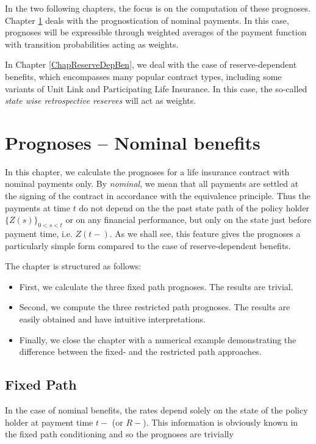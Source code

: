 \documentclass{article}
\newcommand{\1}[1]{\mathbbm{1}_{\left\lbrace #1 \right\rbrace}}
\theoremstyle{break}
\theoremstyle{remark}
\numberwithin{equation}{section}
\begin{document}
In the two following chapters, the focus is on the computation of these prognoses. Chapter \ref{ChapGuaranteedBen} deals with the prognostication of nominal payments. In this case, prognoses will be expressible through weighted averages of the payment function with transition probabilities acting as weights.

In Chapter \ref{ChapReserveDepBen}, we deal with the case of reserve-dependent benefits, which encompasses many popular contract types, including some variants of Unit Link and Participating Life Insurance. In this case, the so-called \textit{state wise retrospective reserves} will act as weights.

\newpage
\section{Prognoses -- Nominal benefits} \label{ChapGuaranteedBen}

In this chapter, we calculate the prognoses for a life insurance contract with nominal payments only. By \textit{nominal}, we mean that all payments are settled at the signing of the contract in accordance with the equivalence principle. Thus the payments at time $t$ do not depend on the the past state path of the policy holder $\{ Z(s) \}_{0 < s < t}$ or on any financial performance, but only on the state just before payment time,  i.e. $Z(t-)$. As we shall see, this feature gives the prognoses a particularly simple form compared to the case of reserve-dependent benefits.

The chapter is structured as follows:

\begin{itemize}
	\item First, we calculate the three fixed path prognoses. The results are trivial.
	\item Second, we compute the three restricted path prognoses. The results are easily obtained and have intuitive interpretations.
	\item Finally, we close the chapter with a numerical example demonstrating the difference between the fixed- and the restricted path approaches.
\end{itemize}

\subsection{Fixed Path}

In the case of nominal benefits, the rates depend solely on the state of the policy holder at payment time $t-$ (or $R-$). This information is obviously known in the fixed path conditioning and so the prognoses are trivially
\end{document}
